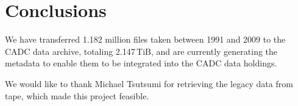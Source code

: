 \documentclass[11pt,twoside]{article}
\begin{document}
\section{Conclusions}

We have transferred 1.182 million files taken between 1991 and 2009 to
the CADC data archive, totaling 2.147\,TiB, and are currently generating
the metadata to enable them to be integrated into the CADC data
holdings.

\acknowledgements We would like to thank
Michael Tsutsumi for
retrieving the legacy data from tape,
which made this project feasible.


\end{document}
